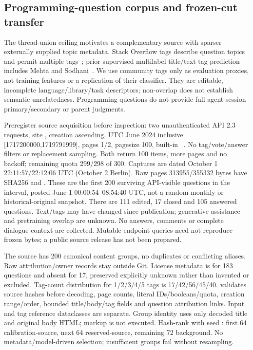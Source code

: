 \documentclass[11pt]{article}
\begin{document}
\subsection{Programming-question corpus and frozen-cut transfer}
The thread-union ceiling motivates a complementary source with sparser
externally supplied topic metadata. Stack Overflow tags describe question
topics and permit multiple tags~\cite{stackoverflowtags}; prior supervised
multilabel title/text tag prediction includes Mehta and Sodhani~\cite{mehta2015tagger}.
We use community tags only as evaluation proxies, not training features or a
replication of their classifier. They are editable, incomplete language/library/task
descriptors; non-overlap does not establish semantic unrelatedness. Programming
questions do not provide full agent-session primary/secondary or parent judgments.

Preregister source acquisition before inspection: two unauthenticated API 2.3
 requests, site , creation ascending,
UTC June 2024 inclusive [1717200000,1719791999], pages 1/2, pagesize 100,
built-in ~\cite{stackexchangequestions}. No tag/vote/answer
filters or replacement sampling. Both return 100 items, more pages and no backoff;
remaining quota 299/298 of 300. Captures are dated October 1 22:11:57/22:12:06 UTC
(October 2 Berlin). Raw pages 313955/355332 bytes have SHA256
and .
These are the first 200 surviving API-visible questions in the interval, posted
June 1 00:00:54--08:54:40 UTC, not a random monthly or historical-original snapshot.
There are 111 edited, 17 closed and 105 answered questions. Text/tags may have
changed since publication; generative assistance and pretraining overlap are
unknown. No answers, comments or complete dialogue context are collected.
Mutable endpoint queries need not reproduce frozen bytes; a public source
release has not been prepared.

The source has 200 canonical content groups, no duplicates or conflicting aliases.
Raw attribution/owner records stay outside Git. License metadata is
 for 183 questions and absent for 17, preserved explicitly
unknown rather than invented or excluded. Tag-count distribution for 1/2/3/4/5
tags is 17/42/56/45/40.  validates source hashes
before decoding, page counts, literal IDs/booleans/quota, creation range/order,
bounded title/body/tag fields and question attribution links. Input and tag
reference dataclasses are separate. Group identity uses only decoded title and
original body HTML; markup is not executed. Hash-rank with seed
: first 64 calibration-source,
next 64 reserved-source, remaining 72 background. No metadata/model-driven
selection; insufficient groups fail without resampling.
\end{document}
